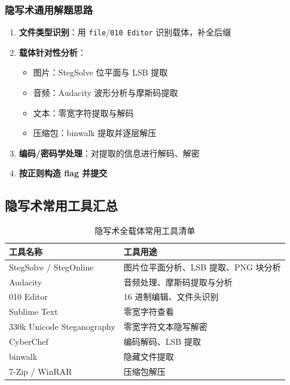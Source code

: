 \subsubsection{隐写术通用解题思路}
\begin{enumerate}[leftmargin=*]
    \item \textbf{文件类型识别}：用 \texttt{file}/\texttt{010 Editor} 识别载体，补全后缀
    \item \textbf{载体针对性分析}：
    \begin{itemize}[leftmargin=*]
        \item 图片：StegSolve 位平面与 LSB 提取
        \item 音频：Audacity 波形分析与摩斯码提取
        \item 文本：零宽字符提取与解码
        \item 压缩包：binwalk 提取并逐层解压
    \end{itemize}
    \item \textbf{编码/密码学处理}：对提取的信息进行解码、解密
    \item \textbf{按正则构造 flag 并提交}
\end{enumerate}

\subsection{隐写术常用工具汇总}
\begin{table}[htbp]
    \centering
    \caption{隐写术全载体常用工具清单}
    \begin{tabular}{ll}
        \toprule
        工具名称 & 工具用途 \\
        \midrule
        StegSolve / StegOnline & 图片位平面分析、LSB 提取、PNG 块分析 \\
        Audacity & 音频处理、摩斯码提取与分析 \\
        010 Editor & 16 进制编辑、文件头识别 \\
        Sublime Text & 零宽字符查看 \\
        330k Unicode Steganography & 零宽字符文本隐写解密 \\
        CyberChef & 编码解码、LSB 提取 \\
        binwalk & 隐藏文件提取 \\
        7-Zip / WinRAR & 压缩包解压 \\
        \bottomrule
    \end{tabular}
\end{table}

